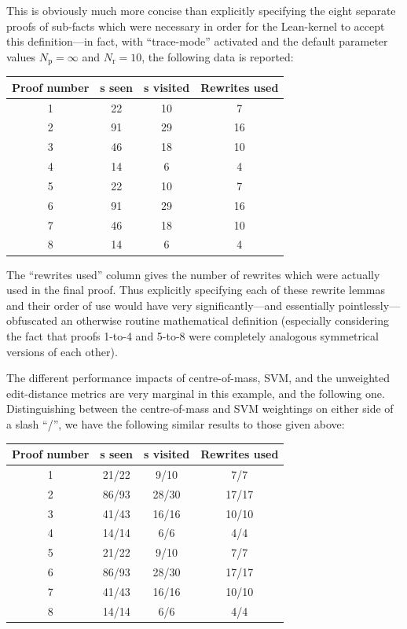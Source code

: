 \documentclass[12pt]{article}
\begin{document}
This is obviously much more concise than explicitly specifying the eight separate proofs of sub-facts which were necessary in order for the Lean-kernel to accept this definition---in fact, with ``trace-mode'' activated and the default parameter values $N_\text{p} = \infty$ and $N_\text{r} = 10$, the following data is reported:
\begin{center}
  \begin{tabular}{c c c c}
    \toprule
    Proof number & \expr{}s seen & \expr{}s visited & Rewrites used\\\midrule
1 & 22 & 10 & 7\\
2 & 91 & 29 & 16\\
3 & 46 & 18 & 10\\
4 & 14 & 6 & 4\\
5 & 22 & 10 & 7\\
6 & 91 & 29 & 16\\
7 & 46 & 18 & 10\\
8 & 14 & 6 & 4\\\bottomrule
  \end{tabular}
\end{center}
The ``rewrites used'' column gives the number of rewrites which were actually used in the final proof. Thus explicitly specifying each of these rewrite lemmas and their order of use would have very significantly---and essentially pointlessly---obfuscated an otherwise routine mathematical definition (especially considering the fact that proofs 1-to-4 and 5-to-8 were completely analogous symmetrical versions of each other).

The different performance impacts of centre-of-mass, SVM, and the unweighted edit-distance metrics are very marginal in this example, and the following one.
Distinguishing between the centre-of-mass and SVM weightings on either side of a slash ``/'', we have the following similar results to those given above:
\begin{center}
  \begin{tabular}{c c c c}
    \toprule
    Proof number & \expr{}s seen & \expr{}s visited & Rewrites used\\\midrule
    1 & 21/22 & 9/10 & 7/7\\
    2 & 86/93 & 28/30 & 17/17\\
    3 & 41/43 & 16/16 & 10/10\\
    4 & 14/14 & 6/6 & 4/4\\
    5 & 21/22 & 9/10 & 7/7\\
    6 & 86/93 & 28/30 & 17/17\\
    7 & 41/43 & 16/16 & 10/10\\
    8 & 14/14 & 6/6 & 4/4\\\bottomrule
  \end{tabular}
\end{center}
\end{document}
